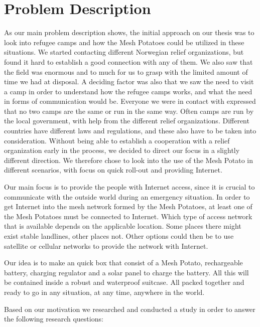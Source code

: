 \section{Problem Description}
As our main problem description shows, the initial approach on our thesis was to look into refugee camps and how the Mesh Potatoes could be utilized in these situations. We started contacting different Norwegian relief organizations, but found it hard to establish a good connection with any of them. We also saw that the field was enormous and to much for us to grasp with the limited amount of time we had at disposal. A deciding factor was also that we saw the need to visit a camp in order to understand how the refugee camps works, and what the need in forms of communication would be. Everyone we were in contact with expressed that no two camps are the same or run in the same way. Often camps are run by the local government, with help from the different relief organizations. Different countries have different laws and regulations, and these also have to be taken into consideration. Without being able to establish a cooperation with a relief organization early in the process, we decided to direct our focus in a slightly different direction. We therefore chose to look into the use of the Mesh Potato in different scenarios, with focus on quick roll-out and providing Internet.

Our main focus is to provide the people with Internet access, since it is crucial to communicate with the outside world during an emergency situation. In order to get Internet into the mesh network formed by the Mesh Potatoes, at least one of the Mesh Potatoes must be connected to Internet. Which type of access network that is available depends on the applicable location. Some places there might exist stable landlines, other places not. Other options could then be to use satellite or cellular networks to provide the network with Internet.  

Our idea is to make an \gls{quick} box that consist of a Mesh Potato, rechargeable battery, charging regulator and a solar panel to charge the battery. All this will be contained inside a robust and waterproof suitcase. All packed together and ready to go in any situation, at any time, anywhere in the world. 

Based on our motivation we researched and conducted a study in order to answer the following research questions: 


